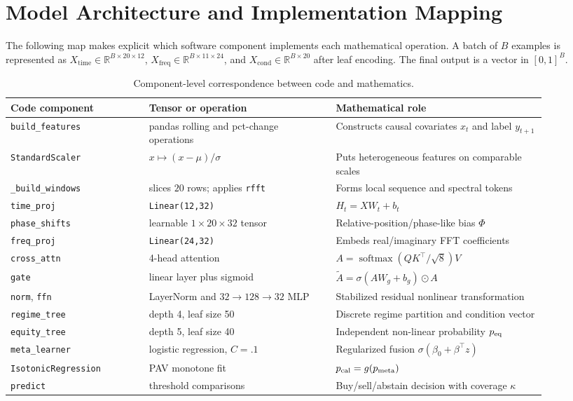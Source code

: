 \documentclass[11pt]{article}
\newcommand{\R}{\mathbb{R}}
\begin{document}
\section{Model Architecture and Implementation Mapping}
The following map makes explicit which software component implements each mathematical operation. A batch of $B$ examples is represented as $X_{\mathrm{time}}\in\R^{B\times20\times12}$, $X_{\mathrm{freq}}\in\R^{B\times11\times24}$, and $X_{\mathrm{cond}}\in\R^{B\times20}$ after leaf encoding. The final output is a vector in $[0,1]^B$.

\begin{table}[t]
\centering\scriptsize
\caption{Component-level correspondence between code and mathematics.}
\label{tab:componentmap}
\begin{tabular}{p{0.23\linewidth}p{0.31\linewidth}p{0.35\linewidth}}
\toprule
Code component & Tensor or operation & Mathematical role \\
\midrule
\texttt{build\_features} & pandas rolling and pct-change operations & Constructs causal covariates $x_t$ and label $y_{t+1}$ \\
\texttt{StandardScaler} & $x\mapsto(x-\mu)/\sigma$ & Puts heterogeneous features on comparable scales \\
\texttt{\_build\_windows} & slices $20$ rows; applies \texttt{rfft} & Forms local sequence and spectral tokens \\
\texttt{time\_proj} & \texttt{Linear(12,32)} & $H_t=XW_t+b_t$ \\
\texttt{phase\_shifts} & learnable $1\times20\times32$ tensor & Relative-position/phase-like bias $\Phi$ \\
\texttt{freq\_proj} & \texttt{Linear(24,32)} & Embeds real/imaginary FFT coefficients \\
\texttt{cross\_attn} & 4-head attention & $A=\operatorname{softmax}(QK^\top/\sqrt{8})V$ \\
\texttt{gate} & linear layer plus sigmoid & $\widetilde A=\sigma(AW_g+b_g)\odot A$ \\
\texttt{norm}, \texttt{ffn} & LayerNorm and $32\to128\to32$ MLP & Stabilized residual nonlinear transformation \\
\texttt{regime\_tree} & depth 4, leaf size 50 & Discrete regime partition and condition vector \\
\texttt{equity\_tree} & depth 5, leaf size 40 & Independent non-linear probability $p_{\rm eq}$ \\
\texttt{meta\_learner} & logistic regression, $C=.1$ & Regularized fusion $\sigma(\beta_0+\beta^\top z)$ \\
\texttt{IsotonicRegression} & PAV monotone fit & $p_{\rm cal}=g(p_{\rm meta})$ \\
\texttt{predict} & threshold comparisons & Buy/sell/abstain decision with coverage $\kappa$ \\
\bottomrule
\end{tabular}
\end{table}
\end{document}
